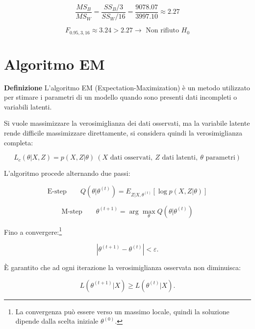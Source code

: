 \documentclass{article}
\newcommand{\df}{\noindent\textbf{Definizione} }
\begin{document}
\[
\frac{MS_B}{MS_W}
=\frac{SS_B/3}{SS_W/16}=
\frac{9078.07}{3997.10}
\approx2.27
\]

$$F_{0.95,3,16}\approx3.24>2.27\rightarrow\text{ Non rifiuto $H_0$}
$$

\section{Algoritmo EM}

\df L'algoritmo EM (Expectation-Maximization) è un metodo utilizzato per stimare i parametri di un modello quando sono presenti dati incompleti o variabili latenti.

Si vuole massimizzare la verosimiglianza dei dati osservati, ma la variabile latente rende difficile massimizzare direttamente, si considera quindi la verosimiglianza completa:

\[
L_c(\theta|X,Z)=p(X,Z|\theta)\ (X\text{ dati osservati},\
Z \text{ dati latenti},\
\theta\text{ parametri})
\]

\vspace{10pt}

L'algoritmo procede alternando due passi:

\[
\boxed{\text{E-step}\qquad Q(\theta|\theta^{(t)})
=
E_{Z|X,\theta^{(t)}}
[\log p(X,Z|\theta)]}
\]

\[
\boxed{\text{M-step}\qquad\theta^{(t+1)}
=
\arg\max_{\theta}
Q(\theta|\theta^{(t)})}
\]\newline

Fino a convergere:\footnote{La convergenza può essere verso un massimo locale, quindi la soluzione dipende dalla scelta iniziale $\theta^{(0)}$.}

\[
|\theta^{(t+1)}-\theta^{(t)}|<\varepsilon.
\]\newline

È garantito che ad ogni iterazione la verosimiglianza osservata non diminuisca:

\[
L(\theta^{(t+1)}|X)\geq L(\theta^{(t)}|X).
\]
\end{document}
